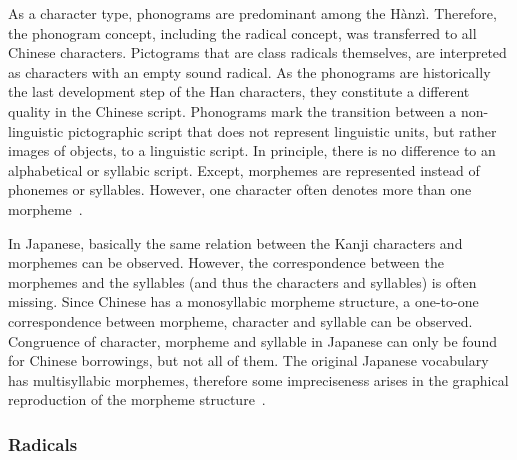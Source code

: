 As a character type, phonograms are predominant among the Hànzì. Therefore, the
phonogram concept, including the radical concept, was transferred to all Chinese 
characters. Pictograms that are class radicals themselves, are interpreted as 
characters with an empty sound radical. As the phonograms are historically the 
last development step of the Han characters, they constitute a different quality 
in the Chinese script. Phonograms mark the transition between a non-linguistic
pictographic script that does not represent linguistic units, but rather images 
of objects, to a linguistic script. In principle, there is no difference to
an alphabetical or syllabic script. Except, morphemes are represented instead of 
phonemes or syllables. However, one character often denotes more than one 
morpheme~.

In Japanese, basically the same relation between the Kanji characters and 
morphemes can be observed. However, the correspondence between the morphemes and 
the syllables (and thus the characters and syllables) is often missing.
Since Chinese has a monosyllabic morpheme structure, a one-to-one correspondence
between morpheme, character and syllable can be observed.
Congruence of character, morpheme and syllable in Japanese can only be found for
Chinese borrowings, but not all of them. The original Japanese vocabulary has
multisyllabic morphemes, therefore some impreciseness arises in the graphical
reproduction of the morpheme structure~.



\subsubsection{Radicals}
\label{sec:radicals}


